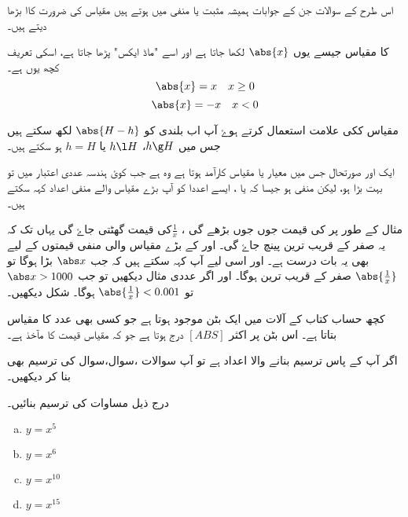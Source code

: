 اس طرح کے سوالات جن کے جوابات ہمیشہ مثبت یا منفی میں ہوتے ہیں مقیاس کی ضرورت کاا بڑھا دیتے ہیں۔

 کا مقیاس جیسے یوں \(\abs{x}\) لکھا جاتا ہے اور اسے "ماڈ ایکس" پڑھا جاتا ہے، اسکی تعریف کچھ یوں ہے۔
\[\abs{x}=x\quad x\ge 0\]
\[\abs{x}=-x\quad x<0\]


مقیاس ککی علامت استعمال کرتے ہوۓ آپ اب بلندی کو \( \abs{H-h}  \) لکھ سکتے ہیں جس میں \( h\g H \)، \( h\l H \) یا \( h= H \) ہو سکتے ہیں۔
 



 ایک اور صورتحال جس میں معیار یا مقیاس کارآمد ہوتا ہے وہ ہے جب کوئ ہندسہ عددی اعتبار میں تو بہت بڑا ہو، لیکن منفی ہو جیسا کہ  یا  ، ایسے اعددا کو آپ بڑے مقیاس والے منفی اعداد کہہ سکتے ہیں۔

مثال کے طور پر  کی قیمت جوں جوں بڑھے گی ، \(\frac{1}{x}\)کی قیمت گھٹتی جاۓ گی یہاں تک کہ یہ صفر کے قریب ترین پینچ جاۓ گی۔ اور   کے بڑے مقیاس والی منفی قیمتوں کے لیے بھی یہ بات درست ہے۔ اور اسی لیے آپ کہہ سکتے ہیں کہ جب \(\abs x\) بڑا ہوگا تو \(\abs{\frac{1}{x}}\) صفر کے قریب ترین ہوگا۔ اور اگر عددی مثال دیکھیں تو جب \(\abs x>1000\) تو \(\abs{\frac{1}{x}}<0.001\) ہوگا۔ شکل  دیکھیں۔

کچھ حساب کتاب کے آلات میں ایک بٹن موجود ہوتا ہے جو کسی بھی عدد کا مقیاس بتاتا ہے۔ اس بٹن پر اکثر \( [ABS]\) درج ہوتا ہے جو کہ مقیاس قیمت کا مآخذ ہے۔


اگر آپ کے پاس ترسیم بنانے والا اعداد ہے تو آپ سوالات ،سوال،سوال کی ترسیم بھی بنا کر دیکھیں۔

درج ذیل مساوات کی ترسیم بنائیں۔
\begin{multicols}{2}
\begin{enumerate}[a.]
\item \(  y=x^{5}\)
\item \( y=x^{6}\)
\item \( y=x^{10}\)
\item \( y=x^{15}\)
\end{enumerate}
\end{multicols}

